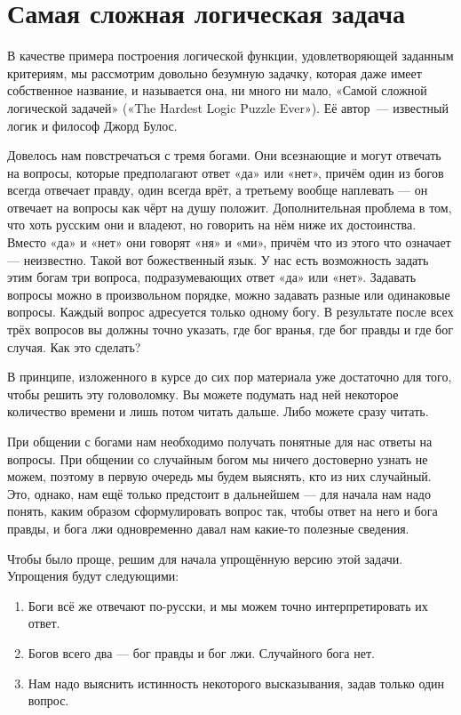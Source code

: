 \section{Самая сложная логическая задача}

В качестве примера построения логической функции, удовлетворяющей заданным критериям, мы рассмотрим довольно безумную задачку, которая даже имеет собственное название, и называется она, ни много ни мало, «Самой сложной логической задачей» («The Hardest Logic Puzzle Ever»). Её автор~--- известный логик и философ Джорд Булос.

\begin{problem}
Довелось нам повстречаться с тремя богами. Они всезнающие и могут отвечать на вопросы, которые предполагают ответ «да» или «нет», причём один из богов всегда отвечает правду, один всегда врёт, а третьему вообще наплевать — он отвечает на вопросы как чёрт на душу положит. Дополнительная проблема в том, что хоть русским они и владеют, но говорить на нём ниже их достоинства. Вместо «да» и «нет» они говорят «ня» и «ми», причём что из этого что означает — неизвестно. Такой вот божественный язык. У нас есть возможность задать этим богам три вопроса, подразумевающих ответ «да» или «нет». Задавать вопросы можно в произвольном порядке, можно задавать разные или одинаковые вопросы. Каждый вопрос адресуется только одному богу. В результате после всех трёх вопросов вы должны точно указать, где бог вранья, где бог правды и где бог случая. Как это сделать?
\end{problem}

В принципе, изложенного в курсе до сих пор материала уже достаточно для того, чтобы решить эту головоломку. Вы можете подумать над ней некоторое количество времени и лишь потом читать дальше. Либо можете сразу читать.

При общении с богами нам необходимо получать понятные для нас ответы на вопросы. При общении со случайным богом мы ничего достоверно узнать не можем, поэтому в первую очередь мы будем выяснять, кто из них случайный. Это, однако, нам ещё только предстоит в дальнейшем — для начала нам надо понять, каким образом сформулировать вопрос так, чтобы ответ на него и бога правды, и бога лжи одновременно давал нам какие-то полезные сведения.

Чтобы было проще, решим для начала упрощённую версию этой задачи. Упрощения будут следующими:

\begin{enumerate}
\item Боги всё же отвечают по-русски, и мы можем точно интерпретировать их ответ.
\item Богов всего два — бог правды и бог лжи. Случайного бога нет.
\item Нам надо выяснить истинность некоторого высказывания, задав только один вопрос.
\end{enumerate}

